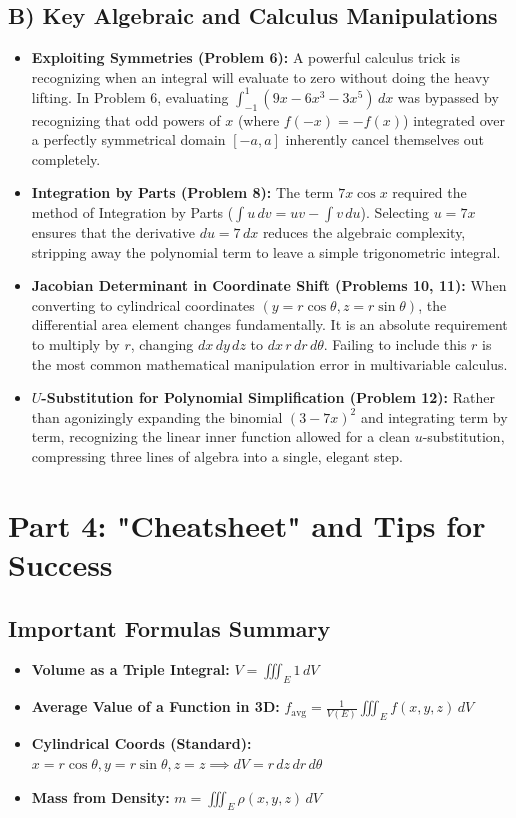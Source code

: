 \documentclass[12pt]{article}
\begin{document}
\subsection{B) Key Algebraic and Calculus Manipulations}
\begin{itemize}
    \item \textbf{Exploiting Symmetries (Problem 6):}
    A powerful calculus trick is recognizing when an integral will evaluate to zero without doing the heavy lifting. In Problem 6, evaluating $\int_{-1}^{1} (9x - 6x^3 - 3x^5) \, dx$ was bypassed by recognizing that odd powers of $x$ (where $f(-x) = -f(x)$) integrated over a perfectly symmetrical domain $[-a, a]$ inherently cancel themselves out completely.
    \item \textbf{Integration by Parts (Problem 8):}
    The term $7x\cos x$ required the method of Integration by Parts ($\int u \, dv = uv - \int v \, du$). Selecting $u=7x$ ensures that the derivative $du=7 \, dx$ reduces the algebraic complexity, stripping away the polynomial term to leave a simple trigonometric integral.
    \item \textbf{Jacobian Determinant in Coordinate Shift (Problems 10, 11):}
    When converting to cylindrical coordinates $(y=r\cos\theta, z=r\sin\theta)$, the differential area element changes fundamentally. It is an absolute requirement to multiply by $r$, changing $dx \, dy \, dz$ to $dx \, r \, dr \, d\theta$. Failing to include this $r$ is the most common mathematical manipulation error in multivariable calculus.
    \item \textbf{$U$-Substitution for Polynomial Simplification (Problem 12):}
    Rather than agonizingly expanding the binomial $(3-7x)^2$ and integrating term by term, recognizing the linear inner function allowed for a clean $u$-substitution, compressing three lines of algebra into a single, elegant step.
\end{itemize}

\newpage
\section{Part 4: "Cheatsheet" and Tips for Success}

\subsection{Important Formulas Summary}
\begin{itemize}
    \item \textbf{Volume as a Triple Integral:} $V = \iiint_E 1 \, dV$
    \item \textbf{Average Value of a Function in 3D:} $f_{\text{avg}} = \frac{1}{V(E)} \iiint_E f(x,y,z) \, dV$
    \item \textbf{Cylindrical Coords (Standard):} $x = r\cos\theta, y = r\sin\theta, z = z \implies dV = r \, dz \, dr \, d\theta$
    \item \textbf{Mass from Density:} $m = \iiint_E \rho(x,y,z) \, dV$
\end{itemize}
\end{document}
